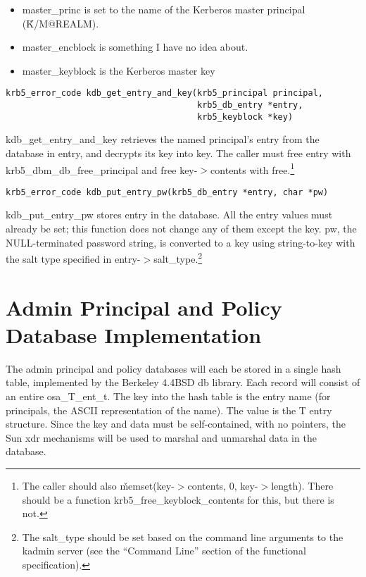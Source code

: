 \begin{itemize}
\item master_princ is set to the name of the Kerberos master principal
(\v{K/M@REALM}).

\item master_encblock is something I have no idea about.

\item master_keyblock is the Kerberos master key
\end{itemize}

\begin{verbatim}
krb5_error_code kdb_get_entry_and_key(krb5_principal principal,
                                      krb5_db_entry *entry,
                                      krb5_keyblock *key)
\end{verbatim}

kdb_get_entry_and_key retrieves the named principal's entry from the
database in entry, and decrypts its key into key.  The caller must
free entry with krb5_dbm_db_free_principal and free key-$>$contents with
free.\footnote{The caller should also \v{memset(key-$>$contents, 0,
key-$>$length)}.  There should be a function krb5_free_keyblock_contents
for this, but there is not.}

\begin{verbatim}
krb5_error_code kdb_put_entry_pw(krb5_db_entry *entry, char *pw)
\end{verbatim}

kdb_put_entry_pw stores entry in the database.  All the entry values
must already be set; this function does not change any of them except
the key.  pw, the NULL-terminated password string, is converted to a
key using string-to-key with the salt type specified in
entry-$>$salt_type.\footnote{The salt_type should be set based on the
command line arguments to the kadmin server (see the ``Command Line''
section of the functional specification).}

\section{Admin Principal and Policy Database Implementation}

The admin principal and policy databases will each be stored in a
single hash table, implemented by the Berkeley 4.4BSD db library.
Each record will consist of an entire osa_T_ent_t.  The key into the
hash table is the entry name (for principals, the ASCII representation
of the name).  The value is the T entry structure.  Since the key and
data must be self-contained, with no pointers, the Sun xdr mechanisms
will be used to marshal and unmarshal data in the database.


